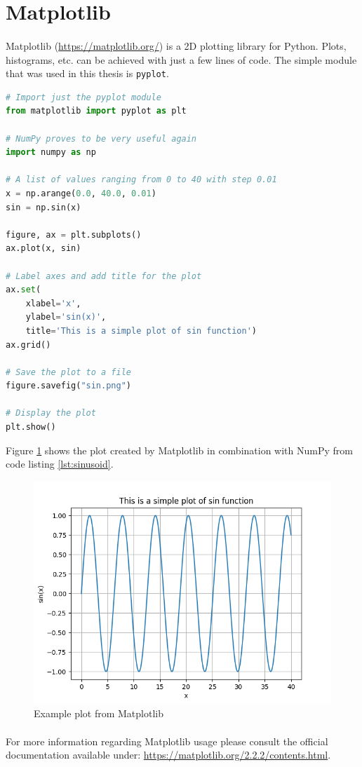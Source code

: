 \section{Matplotlib}
\paragraph{}
Matplotlib (\url{https://matplotlib.org/}) is a 2D plotting library for Python. Plots, histograms, etc. can be achieved with just a few lines of code. The simple module that was used in this thesis is \texttt{pyplot}.

\begin{lstlisting}[language=Python, caption=Example usage of Matplotlib, label={lst:sinusoid}, basicstyle={\ttfamily}]
# Import just the pyplot module
from matplotlib import pyplot as plt

# NumPy proves to be very useful again
import numpy as np

# A list of values ranging from 0 to 40 with step 0.01
x = np.arange(0.0, 40.0, 0.01)
sin = np.sin(x)

figure, ax = plt.subplots()
ax.plot(x, sin)

# Label axes and add title for the plot
ax.set(
    xlabel='x',
    ylabel='sin(x)',
    title='This is a simple plot of sin function')
ax.grid()

# Save the plot to a file
figure.savefig("sin.png")

# Display the plot
plt.show()
\end{lstlisting}

Figure \ref{fig:matplotlib} shows the plot created by Matplotlib in combination with NumPy from code listing \ref{lst:sinusoid}.

\begin{figure}[H]
	\centering
	\includegraphics[width=\textwidth]{images/sin}
	\caption{Example plot from Matplotlib}
	\label{fig:matplotlib}
\end{figure}

\paragraph{}
For more information regarding Matplotlib usage please consult the official documentation available under: \url{https://matplotlib.org/2.2.2/contents.html}.